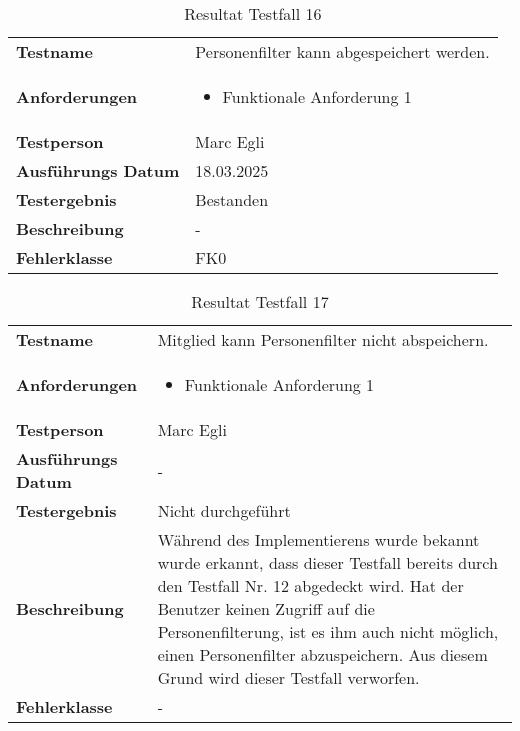\begin{table}[H]
    \begin{tabular}{|L{0.3\textwidth}|L{0.65\textwidth}|}
        \hline
           \\[10pt]
        \hline
        \textbf{Testname} & Personenfilter kann abgespeichert werden. \\
        \hline
        \textbf{Anforderungen} & 
        \begin{itemize}
            \item Funktionale Anforderung 1
        \end{itemize} \\
        \hline
        \textbf{Testperson} & Marc Egli \\
        \hline
        \textbf{Ausführungs Datum} & 18.03.2025 \\
        \hline
        \textbf{Testergebnis} & Bestanden \\
        \hline
        \textbf{Beschreibung} & - \\ 
        \hline
        \textbf{Fehlerklasse} & FK0 \\ 
        \hline
    \end{tabular}
    \caption{Resultat Testfall 16}
\end{table}

\begin{table}[H]
    \begin{tabular}{|L{0.3\textwidth}|L{0.65\textwidth}|}
        \hline
           \\[10pt]
        \hline
        \textbf{Testname} & Mitglied kann Personenfilter nicht abspeichern. \\
        \hline
        \textbf{Anforderungen} & 
        \begin{itemize}
            \item Funktionale Anforderung 1
        \end{itemize} \\
        \hline
        \textbf{Testperson} & Marc Egli \\
        \hline
        \textbf{Ausführungs Datum} & - \\
        \hline
        \textbf{Testergebnis} & Nicht durchgeführt \\
        \hline
        \textbf{Beschreibung} & Während des Implementierens wurde bekannt wurde erkannt, dass dieser Testfall bereits
        durch den Testfall Nr. 12 abgedeckt wird. Hat der Benutzer keinen Zugriff auf die Personenfilterung, ist es ihm auch nicht möglich,
        einen Personenfilter abzuspeichern. Aus diesem Grund wird dieser Testfall verworfen. \\ 
        \hline
        \textbf{Fehlerklasse} & - \\ 
        \hline
    \end{tabular}
    \caption{Resultat Testfall 17}
\end{table}

